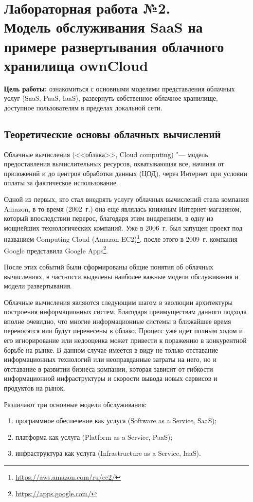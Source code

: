 \section[ЛР №2. Модель обслуживания SaaS, ownCloud]{Лабораторная работа №2. \\
Модель обслуживания SaaS на примере развертывания облачного хранилища ownCloud}

\textbf{Цель работы:} ознакомиться с основными моделями представления облачных услуг (SaaS, PaaS, IaaS), развернуть собственное облачное хранилище, доступное пользователям в пределах локальной сети.

\subsection{Теоретические основы облачных вычислений}

Облачные вычисления (<<облака>>, Cloud computing) "--- модель предоставления вычислительных ресурсов, охватывающая все, начиная от приложений и до центров обработки данных (ЦОД), через Интернет при условии оплаты за фактическое использование.

Одной из первых, кто стал внедрять услугу облачных вычислений стала компания Amazon, в то время (2002~г.) она еще являлась книжным Интернет-магазином, который впоследствии перерос, благодаря этим внедрениям, в одну из мощнейших технологических компаний.
Уже в 2006~г. был запущен проект под названием Computing Cloud (Amazon EC2)\footnote{\url{https://aws.amazon.com/ru/ec2/}}, после этого в 2009~г. компания Google представила Google Apps\footnote{\url{https://apps.google.com/}}.

После этих событий были сформированы общие понятия об облачных вычислениях, в частности выделены наиболее важные модели обслуживания и модели развертывания.

Облачные вычисления являются следующим шагом в эволюции архитектуры построения информационных систем.
Благодаря преимуществам данного подхода вполне очевидно, что многие информационные системы в ближайшее время переносятся или будут перенесены в облако.
Процесс уже идет полным ходом и его игнорирование или недооценка может привести к поражению в конкурентной борьбе на рынке.
В данном случае имеется в виду не только отставание информационных технологий или неоправданные затраты на него, но и отставание в развитии бизнеса компании, которая зависит от гибкости информационной инфраструктуры и скорости вывода новых сервисов и продуктов на рынок.

Различают три основные модели обслуживания:
\begin{enumerate}
    \item программное обеспечение как услуга (Software as a Service, SaaS);
    \item платформа как услуга (Platform as a Service, PaaS);
    \item инфраструктура как услуга (Infrastructure as a Service, IaaS).
\end{enumerate}

